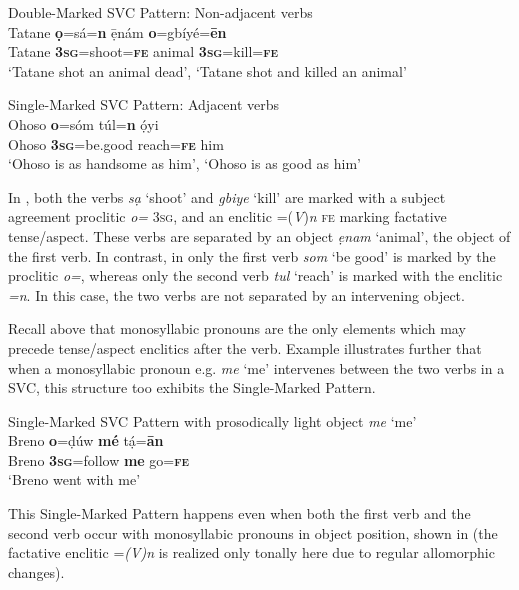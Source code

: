 \documentclass[output=paper]{langsci/langscibook}
\begin{document}
\ea
{Double-Marked SVC Pattern: Non-adjacent verbs}\\
\gll  Tatane  \textbf{ọ}=sá=\textbf{n}      ẹ̄nám  \textbf{o}=gbíyé=\textbf{ēn}\\
     Tatane  \textbf{3}\textbf{\textsc{sg}}=shoot=\textbf{\textsc{fe}}  animal  \textbf{3}\textbf{\textsc{sg}}=kill=\textbf{\textsc{fe}}\\
\glt ‘Tatane shot an animal dead’, ‘Tatane shot and killed an animal’
\z

\ea
{Single-Marked SVC Pattern: Adjacent verbs}\\
\gll  Ohoso   \textbf{o}=sóm       túl=\textbf{n}     ọ́yi\\
     Ohoso  \textbf{3}\textbf{\textsc{sg}}=be.good    reach=\textbf{\textsc{fe}}  him\\
\glt ‘Ohoso is as handsome as him’, ‘Ohoso is as good as him’
\z

In , both the verbs \textit{sạ} ‘shoot’ and \textit{gbiye} ‘kill’ are marked with a subject agreement proclitic \textit{o=} \textsc{3sg}, and an enclitic =(\textit{V})\textit{n} \textsc{fe} marking factative tense/aspect. These verbs are separated by an object \textit{ẹnam} ‘animal’, the object of the first verb. In contrast, in  only the first verb \textit{som} ‘be good’ is marked by the proclitic \textit{o=}, whereas only the second verb \textit{tul} ‘reach’ is marked with the enclitic \textit{=n}. In this case, the two verbs are not separated by an intervening object. 

Recall above that monosyllabic pronouns are the only elements which may precede tense/aspect enclitics after the verb. Example  illustrates further that when a monosyllabic pronoun e.g. \textit{me} ‘me’ intervenes between the two verbs in a SVC, this structure too exhibits the Single-Marked Pattern. 

\ea
{Single-Marked SVC Pattern with prosodically light object \textit{me} ‘me’}\\
\gll  Breno  \textbf{o}=ḍúw    \textbf{mé}  tạ́=\textbf{ān}\\
     Breno   \textbf{3}\textbf{\textsc{sg}}=follow   \textbf{me}  go=\textbf{\textsc{fe}}\\
\glt ‘Breno went with me’ \citep[115]{Kari2004}
\z


This Single-Marked Pattern happens even when both the first verb and the second verb occur with monosyllabic pronouns in object position, shown in  (the factative enclitic =\textit{(V)n} is realized only tonally here due to regular allomorphic changes).
\end{document}
